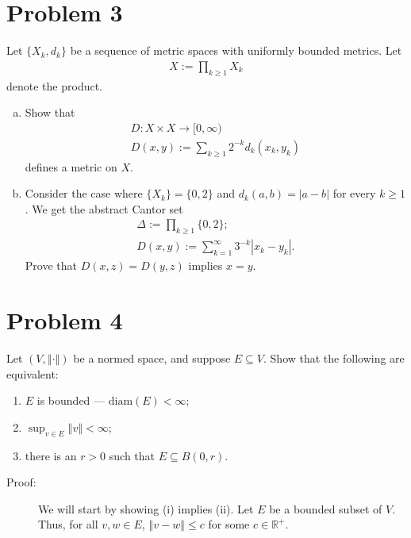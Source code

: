 \documentclass[8pt]{extarticle}
\newcommand{\R}{\mathbb{R}}
\newcommand{\norm}[1]{\left\Vert #1\right\Vert}
\begin{document}
  \section{Problem 3}%
  Let $\{X_k,d_k\}$ be a sequence of metric spaces with uniformly bounded metrics. Let
  \begin{align*}
    X := \prod_{k\geq 1} X_k
  \end{align*}
  denote the product.
  \begin{enumerate}[(a)]
    \item Show that
      \begin{align*}
        D: X\times X \rightarrow [0,\infty)\\
        D(x,y) := \sum_{k\geq1}2^{-k}d_k(x_k,y_k)
      \end{align*}
      defines a metric on $X$.
    \item Consider the case where $\{X_k\} = \{0,2\}$ and $d_k(a,b) = |a-b|$ for every $k\geq 1$. We get the abstract Cantor set
      \begin{align*}
        \Delta := \prod_{k\geq 1} \{0,2\};\\
        D(x,y) := \sum_{k=1}^{\infty}3^{-k}|x_k - y_k|.
      \end{align*}
      Prove that $D(x,z) = D(y,z)$ implies $x=y$.
  \end{enumerate}
  \section{Problem 4}%
  Let $(V,\norm{\cdot})$ be a normed space, and suppose $E\subseteq V$. Show that the following are equivalent:
  \begin{enumerate}[(1)]
    \item $E$ is bounded --- $\text{diam}(E) < \infty$;
    \item $\sup_{v\in E}\norm{v} < \infty$;
    \item there is an $r > 0$ such that $E\subseteq B(0,r)$.
  \end{enumerate}
  \begin{description}
    \item[Proof:] We will start by showing (i) implies (ii). Let $E$ be a bounded subset of $V$. Thus, for all $v,w\in E$, $\norm{v-w} \leq c$ for some $c\in \R^{+}$.
  \end{description}
\end{document}
